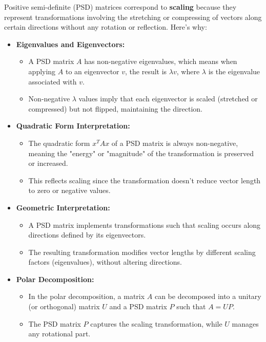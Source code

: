 \begin{airesult}
Positive semi-definite (PSD) matrices correspond to \textbf{scaling} because they represent
transformations involving the stretching or compressing of vectors along certain directions without
any rotation or reflection. Here's why:

\vsp

\begin{itemize}
  \item \textbf{Eigenvalues and Eigenvectors:}
  \begin{itemize}
    \item A PSD matrix \(A\) has non-negative eigenvalues, which means when applying \(A\) to an
eigenvector \(v\), the result is \(\lambda v\), where \(\lambda\) is the eigenvalue associated with
\(v\).
    \item Non-negative \(\lambda\) values imply that each eigenvector is scaled (stretched or
compressed) but not flipped, maintaining the direction.
  \end{itemize}

  \vsp

  \item \textbf{Quadratic Form Interpretation:}
  \begin{itemize}
    \item The quadratic form \(x^T A x\) of a PSD matrix is always non-negative, meaning the
"energy" or "magnitude" of the transformation is preserved or increased.
    \item This reflects scaling since the transformation doesn't reduce vector length to zero or
negative values.
  \end{itemize}

  \vsp

  \item \textbf{Geometric Interpretation:}
  \begin{itemize}
    \item A PSD matrix implements transformations such that scaling occurs along directions defined
by its eigenvectors.
    \item The resulting transformation modifies vector lengths by different scaling factors
(eigenvalues), without altering directions.
  \end{itemize}

  \vsp

  \item \textbf{Polar Decomposition:}
  \begin{itemize}
    \item In the polar decomposition, a matrix \(A\) can be decomposed into a unitary (or
orthogonal) matrix \(U\) and a PSD matrix \(P\) such that \(A = UP\).
    \item The PSD matrix \(P\) captures the scaling transformation, while \(U\) manages any
rotational part.
  \end{itemize}


\end{itemize}
\end{airesult}
